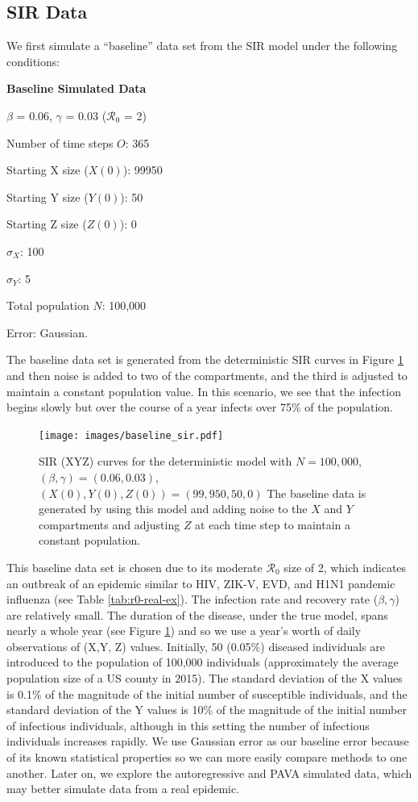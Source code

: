 \documentclass[12pt]{article}
\newcommand{\rr}{\ensuremath{\mathcal{R}_0}}
\begin{document}
\subsection{SIR Data}

We first simulate a ``baseline'' data set from the SIR model under the following conditions: 

\textbf{Baseline Simulated Data}
\begin{center}
	
	$\beta$ = 0.06, $\gamma$ = 0.03 ($\rr$ = 2)
	
	Number of time steps $O$: 365
	
	Starting X size ($X(0)$): 99950
	
	Starting Y size ($Y(0)$): 50
	
	Starting Z size ($Z(0)$): 0 
	
	$\sigma_X$: 100
	
	$\sigma_Y$: 5
	
	Total population $N$: 100,000

        Error: Gaussian.
	
      \end{center}
      The baseline data set is generated from the deterministic SIR curves in Figure \ref{fig:baseline-data} and then noise is added to two of the compartments, and the third is adjusted to maintain a constant population value.  In this scenario, we see that the infection begins slowly but over the course of a year infects over 75\% of the population.
      \begin{figure}
        \centering
        \texttt{[image: images/baseline\_sir.pdf]}
        \caption{SIR (XYZ) curves for the deterministic model with $N=100,000$, $(\beta, \gamma) = (0.06, 0.03)$, $(X(0), Y(0), Z(0))= (99,950, 50,0)$  The baseline data is generated by using this model and adding noise to the $X$ and $Y$ compartments and adjusting $Z$ at each time step to maintain a constant population.}\label{fig:baseline-data}
        \end{figure}
      This baseline data set is chosen due to its moderate $\rr$ size of 2, which indicates an outbreak of an epidemic similar to HIV, ZIK-V, EVD, and H1N1 pandemic influenza (see Table \ref{tab:r0-real-ex}).  The infection rate and recovery rate ($\beta, \gamma$) are relatively small.  The duration of the disease, under the true model, spans nearly a whole year (see Figure \ref{fig:baseline-data}) and so we use a year's worth of daily observations of (X,Y, Z) values.  Initially, 50 (0.05\%) diseased individuals are introduced to the population of 100,000 individuals (approximately the average population size of a US county in 2015).  The standard deviation of the X values is 0.1\% of the magnitude of the initial number of susceptible individuals, and the standard deviation of the Y values is 10\% of the magnitude of the initial number of infectious individuals, although in this setting the number of infectious individuals increases rapidly.  We use Gaussian error as our baseline error because of its known statistical properties so we can more easily compare methods to one another.  Later on, we explore the autoregressive and PAVA simulated data, which may better simulate data from  a real epidemic.
\end{document}
